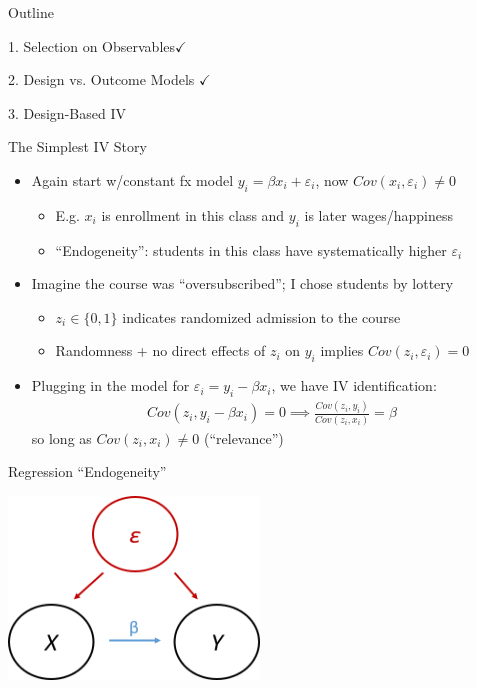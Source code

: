 \documentclass[11pt,english]{beamer}
\begin{document}
\begin{frame}{Outline}

\textcolor{red!75!green!50!blue!25!gray}{1. Selection on Observables}$\checkmark$
\vspace{0.8cm}

\textcolor{red!75!green!50!blue!25!gray}{2. Design vs. Outcome Models }$\checkmark$
\vspace{0.8cm}

3. Design-Based IV

\end{frame}

\begin{frame}{The Simplest IV Story}

\begin{itemize}
\item Again start w/constant fx model $y_{i}=\beta x_i+\varepsilon_i$, now $Cov(x_i,\varepsilon_i)\neq 0$\smallskip
\begin{itemize}
\item E.g. $x_i$ is enrollment in this class  and $y_i$ is later wages/happiness\smallskip
\item ``Endogeneity'': students in this class have systematically higher $\varepsilon_i$
\end{itemize}\bigskip\pause{}

\item Imagine the course was ``oversubscribed''; I chose students by lottery\smallskip
\begin{itemize}
\item $z_i\in\{0,1\}$ indicates randomized admission to the course\smallskip
\item Randomness + no direct effects of $z_i$ on $y_i$ implies $Cov(z_i,\varepsilon_i)=0$
\end{itemize}\bigskip\pause{}
\item Plugging in the model for $\varepsilon_i=y_i-\beta x_i$, we have IV identification:
\begin{align*}
Cov(z_i,y_i-\beta x_i)=0\implies \frac{Cov(z_i,y_i)}{Cov(z_i,x_i)}=\beta
\end{align*}
so long as $Cov(z_i,x_i)\neq 0$ (``relevance'')
\end{itemize}

\end{frame}

\begin{frame}{Regression ``Endogeneity''}

\begin{center}
	\includegraphics[width=0.5\textwidth]{figures/dag2.png}
\end{center}

\end{frame}
\end{document}
